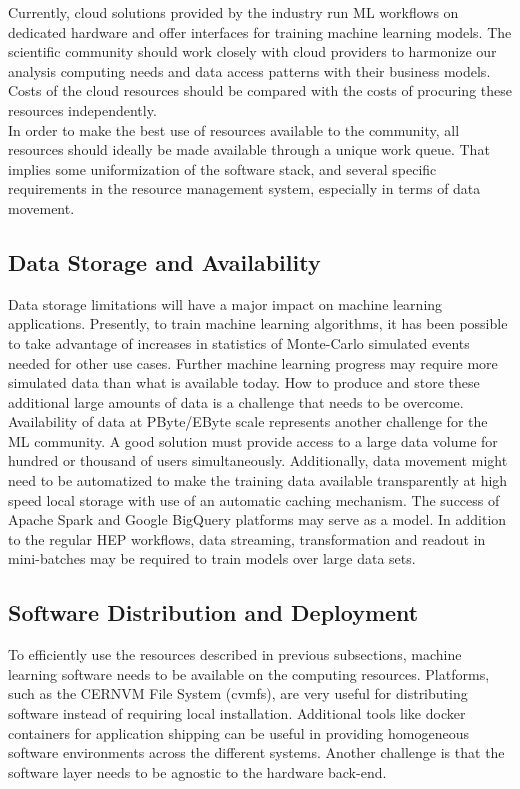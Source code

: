 Currently, cloud solutions provided by the industry run ML workflows on dedicated hardware and offer interfaces for training machine learning models. The scientific community should work closely with cloud providers to harmonize our analysis computing needs and data access patterns with their business models. Costs of the cloud resources should be compared with the costs of procuring these resources independently.\\

In order to make the best use of resources available to the community, all resources should ideally be made available through a unique work queue. That implies some uniformization of the software stack, and several specific requirements in the resource management system, especially in terms of data movement.

\subsection{Data Storage and Availability}
Data storage limitations will have a major impact on machine learning applications. Presently, to train machine learning algorithms, it has been possible to take advantage of increases in statistics of Monte-Carlo simulated events needed for other use cases. Further machine learning progress may require more simulated data than what is available today. How to produce and store these additional large amounts of data is a challenge that needs to be overcome.\\

Availability of data at PByte/EByte scale represents another challenge for the ML community.
A good solution must provide access to a large data volume for hundred or thousand of users simultaneously.
Additionally, data movement might need to be automatized to make the training data available transparently at high speed local storage with use of an automatic caching mechanism.
The success of Apache Spark and Google BigQuery platforms may serve as a model.
In addition to the regular HEP workflows, data streaming, transformation and readout in mini-batches may be required to train models over large data sets.

\subsection{Software Distribution and Deployment}
To efficiently use the resources described in previous subsections, machine learning software needs to be available on the computing resources. Platforms, such as the CERNVM File System (cvmfs), are very useful for distributing software instead of requiring local installation. Additional tools like docker containers for application shipping can be useful in providing homogeneous software environments across the different systems. Another challenge is that the software layer needs to be agnostic to the hardware back-end.

